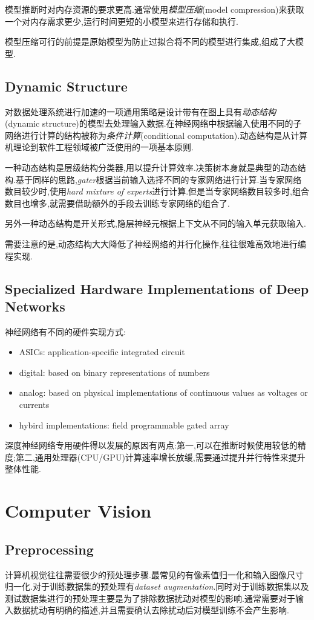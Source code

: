 模型推断时对内存资源的要求更高.通常使用\textit{模型压缩}(model compression)来获取一个对内存需求更少,运行时间更短的小模型来进行存储和执行.

模型压缩可行的前提是原始模型为防止过拟合将不同的模型进行集成,组成了大模型.

\subsection{Dynamic Structure}

对数据处理系统进行加速的一项通用策略是设计带有在图上具有\textit{动态结构}(dynamic structure)的模型去处理输入数据.在神经网络中根据输入使用不同的子网络进行计算的结构被称为\textit{条件计算}(conditional computation).动态结构是从计算机理论到软件工程领域被广泛使用的一项基本原则.

一种动态结构是层级结构分类器,用以提升计算效率.决策树本身就是典型的动态结构.基于同样的思路,\textit{gater}根据当前输入选择不同的专家网络进行计算.当专家网络数目较少时,使用\textit{hard mixture of experts}进行计算.但是当专家网络数目较多时,组合数目也增多,就需要借助额外的手段去训练专家网络的组合了.

另外一种动态结构是开关形式,隐层神经元根据上下文从不同的输入单元获取输入.

需要注意的是,动态结构大大降低了神经网络的并行化操作,往往很难高效地进行编程实现.

\subsection{Specialized Hardware Implementations of Deep Networks}

神经网络有不同的硬件实现方式:
\begin{itemize}
    \item ASICs: application-specific integrated circuit
    \item digital: based on binary representations of numbers
    \item analog: based on physical implementations of continuous values as voltages or currents
    \item hybird implementations: field programmable gated array
\end{itemize}

深度神经网络专用硬件得以发展的原因有两点:第一,可以在推断时候使用较低的精度;第二,通用处理器(CPU/GPU)计算速率增长放缓,需要通过提升并行特性来提升整体性能.

\section{Computer Vision}

\subsection{Preprocessing}

计算机视觉往往需要很少的预处理步骤.最常见的有像素值归一化和输入图像尺寸归一化.对于训练数据集的预处理有\textit{dataset augmentation}.同时对于训练数据集以及测试数据集进行的预处理主要是为了排除数据扰动对模型的影响.通常需要对于输入数据扰动有明确的描述,并且需要确认去除扰动后对模型训练不会产生影响.